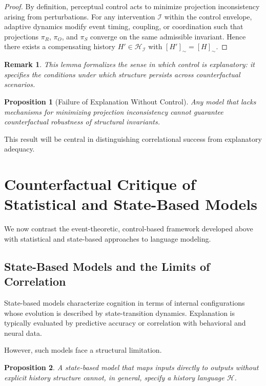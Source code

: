 \documentclass[11pt]{article}
\newtheorem{remark}{Remark}
\newtheorem{proposition}{Proposition}
\begin{document}
\begin{proof}
By definition, perceptual control acts to minimize projection inconsistency arising from perturbations. For any intervention $\mathcal{I}$ within the control envelope, adaptive dynamics modify event timing, coupling, or coordination such that projections $\pi_R$, $\pi_O$, and $\pi_S$ converge on the same admissible invariant. Hence there exists a compensating history $H' \in \mathcal{H}_{\mathcal{I}}$ with $[H']_{\sim} = [H]_{\sim}$.
\end{proof}

\begin{remark}
This lemma formalizes the sense in which control is explanatory: it specifies the conditions under which structure persists across counterfactual scenarios.
\end{remark}

\begin{proposition}[Failure of Explanation Without Control]
Any model that lacks mechanisms for minimizing projection inconsistency cannot guarantee counterfactual robustness of structural invariants.
\end{proposition}

This result will be central in distinguishing correlational success from explanatory adequacy.

\section{Counterfactual Critique of Statistical and State-Based Models}

We now contrast the event-theoretic, control-based framework developed above with statistical and state-based approaches to language modeling.

\subsection{State-Based Models and the Limits of Correlation}

State-based models characterize cognition in terms of internal configurations whose evolution is described by state-transition dynamics. Explanation is typically evaluated by predictive accuracy or correlation with behavioral and neural data.

However, such models face a structural limitation.

\begin{proposition}
A state-based model that maps inputs directly to outputs without explicit history structure cannot, in general, specify a history language $\mathcal{H}$.
\end{proposition}
\end{document}
